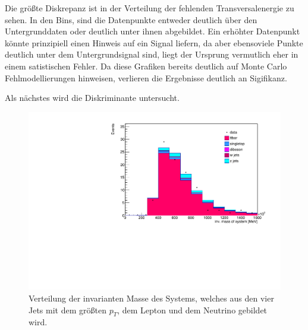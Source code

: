 Die größte Diskrepanz ist in der Verteilung der fehlenden Transversalenergie
zu sehen. In den Bins, sind die Datenpunkte entweder deutlich über den
Untergrunddaten oder deutlich unter ihnen abgebildet. Ein erhöhter Datenpunkt könnte
prinzipiell einen Hinweis auf ein Signal liefern, da aber ebensoviele
Punkte deutlich unter dem Untergrundsignal sind, liegt der Ursprung vermutlich
eher in einem satistischen Fehler. Da diese Grafiken bereits deutlich
auf Monte Carlo Fehlmodellierungen hinweisen, verlieren die Ergebnisse
deutlich an Sigifikanz. \par

Als nächstes wird die Diskriminante untersucht.

\begin{figure}[H]
    \centering
    \includegraphics[width=\linewidth]{plots_and_txt/stacked_plots/stacked_disc.pdf}
    \caption{Verteilung der invarianten Masse des Systems, welches aus den vier Jets mit dem größten $p_T$, dem Lepton und dem Neutrino gebildet wird.}
    \label{fig:stacked_disc}
\end{figure}


